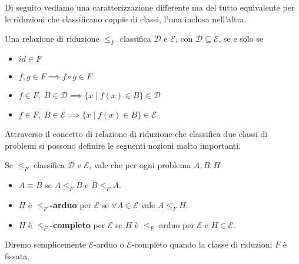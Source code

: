 Di seguito vediamo una caratterizzazione differente ma del tutto
equivalente per le riduzioni che classificano coppie di classi,
l'una inclusa nell'altra.

\begin{lemma}
	Una relazione di riduzione $\leq_F$ classifica $\mathcal{D}$
	e $\mathcal{E}$, con $\mathcal{D} \subseteq \mathcal{E}$, se
	e solo se
	\begin{itemize}
		\item $id \in F$
		\item $f, g \in F \implies f \circ g \in F$
		\item $f \in F, \; B \in \mathcal{D} \implies
			      \{ x \mid f(x) \in B \} \in \mathcal{D}$
		\item $f \in F, \; B \in \mathcal{E} \implies
			      \{ x \mid f(x) \in B \} \in \mathcal{E}$
	\end{itemize}
\end{lemma}

Attraverso il concetto di relazione di riduzione che classifica
due classi di problemi si possono definire le seguenti nozioni
molto importanti.

\begin{definition}
	Se $\leq_F$ classifica $\mathcal{D}$ e $\mathcal{E}$, vale
	che per ogni problema $A, B, H$
	\begin{itemize}
		\item $A \equiv B$ se $A \leq_F B$ e $B \leq_F A$.
		\item $H$ è \textbf{$\leq_F$-arduo} per $\mathcal{E}$ se
		      $\forall A \in \mathcal{E}$ vale $A \leq_F H$.
		\item $H$ è \textbf{$\leq_F$-completo} per $\mathcal{E}$
		      se $H$ è $\leq_F$-arduo per $\mathcal{E}$ e
		      $H \in \mathcal{E}$.
	\end{itemize}
\end{definition}

Diremo semplicemente $\mathcal{E}$-arduo o $\mathcal{E}$-completo
quando la classe di riduzioni $F$ è fissata.

